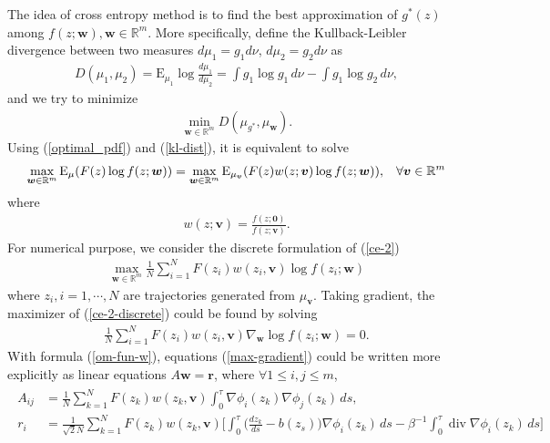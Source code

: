 \documentclass[final]{siamltex}
\begin{document}
The idea of cross entropy method is to find the best approximation of $g^*(z)$ among
$f(z;\bm{w}), \bm{w} \in \mathbb{R}^m$. More specifically, define the
Kullback-Leibler divergence between
two measures $d\mu_1 = g_1d\nu$, $d\mu_2 = g_2d\nu$ as
\begin{align}
  D(\mu_1, \mu_2) = \mathrm{E}_{\mu_1} \log \frac{d\mu_1}{d\mu_2} = \int
  g_1\log g_1\, d\nu - \int g_1\log g_2\,d\nu,
  \label{kl-dist}
\end{align}
and we try to minimize
\begin{align}
  \min_{\bm{w} \in \mathbb{R}^m} D(\mu_{g^*}, \mu_{\bm{w}}).
  \label{kl-dist-d}
\end{align}
Using (\ref{optimal_pdf}) and (\ref{kl-dist}), it is equivalent to solve
\begin{align}
  \max_{\bm{w} \in \mathbb{R}^m} \mathrm{E}_{\mu} ( F(z) \log f(z;\bm{w}))
  = \max_{\bm{w} \in \mathbb{R}^m} \mathrm{E}_{\mu_{\bm{v}}} ( F(z)
  w(z;\bm{v}) \log f(z;\bm{w})), \hspace{3mm} \forall \bm{v} \in
  \mathbb{R}^m
  \label{ce-2}
\end{align}
where
\begin{align}
  w(z;\bm{v}) = \frac{f(z;\bm{0})}{f(z;\bm{v})}.
\end{align}
For numerical purpose, we consider the discrete formulation of (\ref{ce-2})
\begin{align}
\max_{\bm{w} \in \mathbb{R}^m} \frac{1}{N} \sum_{i=1}^{N} F(z_i) w(z_i, \bm{v}) \log f(z_i;\bm{w}) 
\label{ce-2-discrete}
\end{align}
where $z_i, i = 1, \cdots, N$ are trajectories generated from $\mu_{\bm{v}}$. 
Taking gradient, the maximizer of (\ref{ce-2-discrete}) could be found by solving
\begin{align}
  \frac{1}{N} \sum_{i=1}^{N} F(z_i) w(z_i, \bm{v}) \nabla_{\bm{w}} \log
  f(z_i;\bm{w}) = 0.
  \label{max-gradient}
\end{align}
With formula (\ref{om-fun-w}), equations (\ref{max-gradient}) could be written more explicitly
as linear equations $A\bm{w} = \bm{r}$, where $\forall 1\le i,j\le m$, 
\begin{align}
  \begin{split}
  A_{ij} &= \frac{1}{N}\sum_{k = 1}^{N} F(z_k)w(z_k, \bm{v}) \int_0^\tau
    \nabla\phi_i(z_k)\nabla\phi_j(z_k)\,ds, \\
     r_i &= \frac{1}{\sqrt{2}N}\sum_{k = 1}^{N} F(z_k)w(z_k, \bm{v})
    \Big[\int_0^\tau \Big(\frac{dz_k}{ds} - b(z_s)\Big)\nabla\phi_i(z_k)\,ds - \beta^{-1} \int_0^\tau \operatorname{div} \nabla \phi_i(z_k)\,ds\Big]
  \end{split}
  \label{linear-eqn}
\end{align}
\end{document}
